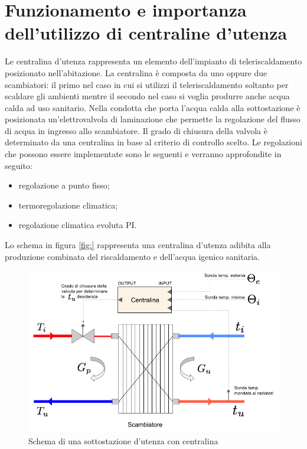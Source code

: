 \documentclass[laurea,oneside,11pt]{USiena_tesiLM}
\begin{document}
\section{Funzionamento e importanza dell'utilizzo di centraline d'utenza}

Le centralina d'utenza rappresenta un elemento dell'impianto di teleriscaldamento posizionato nell'abitazione. La centralina è composta da uno oppure due scambiatori: il primo nel caso in cui si utilizzi il teleriscaldamento soltanto per scaldare gli ambienti mentre il secondo nel caso si voglia produrre anche acqua calda ad uso sanitario. Nella condotta che porta l'acqua calda alla sottostazione è posizionata un'elettrovalvola di laminazione  che permette la regolazione del flusso di acqua in ingresso allo scambiatore. Il grado di chiusura della valvola è determinato da una centralina in base al criterio di controllo scelto. Le regolazioni che possono essere implementate sono le seguenti e verranno approfondite in seguito:

\begin{itemize}
\item regolazione a punto fisso;
\item termoregolazione climatica;
\item regolazione climatica evoluta PI.
\end{itemize}  

Lo schema in figura \ref{fig:} rappresenta una centralina d'utenza adibita alla produzione combinata del riscaldamento e dell'acqua igenico sanitaria.

\begin{figure}[!ht]
\centering
\includegraphics[width=\textwidth]{figure/centralina} 
\caption{Schema di una sottostazione d'utenza con centralina}
\label{fig:centralina}
\end{figure}
\end{document}
